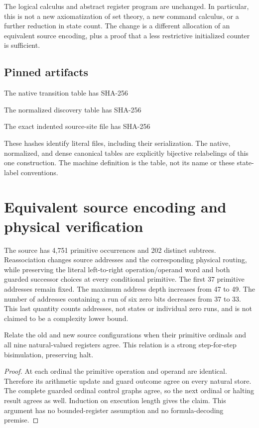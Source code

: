 The logical calculus and abstract register program are unchanged. In particular, this is not a new axiomatization of set theory, a new command calculus, or a further reduction in state count. The change is a different allocation of an equivalent source encoding, plus a proof that a less restrictive initialized counter is sufficient.

\subsection{Pinned artifacts}
The native transition table has SHA-256
\begin{quote}\small{}\end{quote}
The normalized discovery table has SHA-256
\begin{quote}\small{}\end{quote}
The exact indented source-site file has SHA-256
\begin{quote}\small{}\end{quote}
These hashes identify literal files, including their serialization. The native, normalized, and dense canonical tables are explicitly bijective relabelings of this one construction. The machine definition is the table, not its name or these state-label conventions.

\section{Equivalent source encoding and physical verification}
\label{sec:source-correspondence}
The source has 4,751 primitive occurrences and 202 distinct subtrees. Reassociation changes source addresses and the corresponding physical routing, while preserving the literal left-to-right operation/operand word and both guarded successor choices at every conditional primitive. The first 37 primitive addresses remain fixed. The maximum address depth increases from 47 to 49. The number of addresses containing a run of six zero bits decreases from 37 to 33. This last quantity counts addresses, not states or individual zero runs, and is not claimed to be a complexity lower bound.

\begin{lemma}
Relate the old and new source configurations when their primitive ordinals and all nine natural-valued registers agree. This relation is a strong step-for-step bisimulation, preserving halt.
\end{lemma}
\begin{proof}
At each ordinal the primitive operation and operand are identical. Therefore its arithmetic update and guard outcome agree on every natural store. The complete guarded ordinal control graphs agree, so the next ordinal or halting result agrees as well. Induction on execution length gives the claim. This argument has no bounded-register assumption and no formula-decoding premise.
\end{proof}

